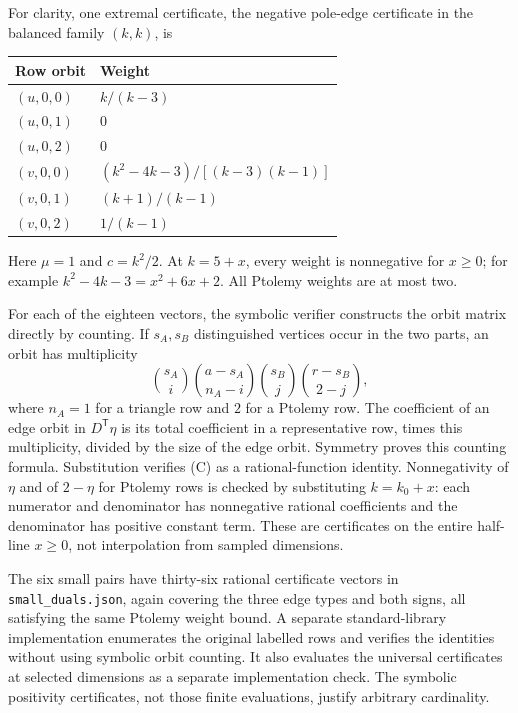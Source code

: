 \documentclass[11pt,a4paper]{article}
\newcounter{none}
\begin{document}
For clarity, one extremal certificate, the negative pole-edge
certificate in the balanced family \((k,k)\), is

{\def\LTcaptype{none} %
\begin{longtable}[]{@{}ll@{}}
\toprule\noalign{}
Row orbit & Weight \\
\midrule\noalign{}
\endhead
\bottomrule\noalign{}
\endlastfoot
\((u,0,0)\) & \(k/(k-3)\) \\
\((u,0,1)\) & \(0\) \\
\((u,0,2)\) & \(0\) \\
\((v,0,0)\) & \((k^2-4k-3)/[(k-3)(k-1)]\) \\
\((v,0,1)\) & \((k+1)/(k-1)\) \\
\((v,0,2)\) & \(1/(k-1)\) \\
\end{longtable}
}

Here \(\mu=1\) and \(c=k^2/2\). At \(k=5+x\), every weight is
nonnegative for \(x\ge0\); for example \(k^2-4k-3=x^2+6x+2\). All
Ptolemy weights are at most two.

For each of the eighteen vectors, the symbolic verifier constructs the
orbit matrix directly by counting. If \(s_A,s_B\) distinguished vertices
occur in the two parts, an orbit has multiplicity
\[\binom{s_A}{i}\binom{a-s_A}{n_A-i}
\binom{s_B}{j}\binom{r-s_B}{2-j},\] where \(n_A=1\) for a triangle row
and \(2\) for a Ptolemy row. The coefficient of an edge orbit in
\(D^{\mathsf T}\eta\) is its total coefficient in a representative row,
times this multiplicity, divided by the size of the edge orbit. Symmetry
proves this counting formula. Substitution verifies (C) as a
rational-function identity. Nonnegativity of \(\eta\) and of \(2-\eta\)
for Ptolemy rows is checked by substituting \(k=k_0+x\): each numerator
and denominator has nonnegative rational coefficients and the
denominator has positive constant term. These are certificates on the
entire half-line \(x\ge0\), not interpolation from sampled dimensions.

The six small pairs have thirty-six rational certificate vectors in
\texttt{small\_duals.json}, again covering the three edge types and both
signs, all satisfying the same Ptolemy weight bound. A separate
standard-library implementation enumerates the original labelled rows
and verifies the identities without using symbolic orbit counting. It
also evaluates the universal certificates at selected dimensions as a
separate implementation check. The symbolic positivity certificates, not
those finite evaluations, justify arbitrary cardinality.
\end{document}

